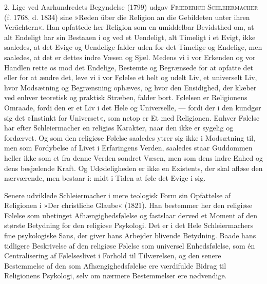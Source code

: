 \documentclass[12pt,a4paper,openany]{book}
\newcommand{\opage}[1]{\marginnote{\footnotesize\textit{[#1]}}}
\begin{document}
2. Lige ved Aarhundredets Begyndelse (1799) udgav
\textsc{Friederich Schleiermacher} (f. 1768, d. 1834) sine »Reden
über die Religion an die Gebildeten unter ihren Verächtern«.
Han opfattede her Religion som en umiddelbar
Bevidsthed om, at alt Endeligt har sin Bestaaen i og
ved et Uendeligt, alt Timeligt i et Evigt, ikke saaledes,
at det Evige og Uendelige falder uden for det Timelige
og Endelige, men saaledes, at det er dettes indre Væsen
og Sjæl. Medens vi i vor Erkenden og vor Handlen
rette os mod det Endelige, Bestemte og Begrænsede for
at opfatte det eller for at ændre det, leve vi i vor Følelse
et helt og udelt Liv, et universelt Liv, hvor Modsætning
og Begrænsning ophæves, og hvor den Ensidighed,
der klæber ved enhver teoretisk og praktisk Stræben,
falder bort. Følelsen er Religionens Omraade, fordi den
er et Liv i det Hele og Universelle, --- fordi der i den
kundgør sig det »Instinkt for Universet«, som netop er
Et med Religionen. Enhver Følelse har efter Schleiermacher
en religiøs Karakter, naar den ikke er sygelig
og fordærvet. Og som den religiøse Følelse saaledes
ytrer sig ikke i Modsætning til, men som Fordybelse af
Livet i Erfaringens Verden, saaledes staar Guddommen
heller ikke som et fra denne Verden sondret Væsen, men
som dens indre Enhed og dens besjælende Kraft. Og
Udødeligheden er ikke en Existents, der skal afløse den
nærværende, men bestaar i: midt i Tiden at føle det Evige
i sig.

\opage{7}Senere udviklede Schleiermacher i mere teologisk
Form sin Opfattelse af Religionen i »Der christliche
Glaube« (1821). Han bestemmer her den religiøse Følelse
som ubetinget Afhængighedsfølelse og fastslaar derved et
Moment af den største Betydning for den religiøse Psykologi.
Det er i det Hele Schleiermachers fine psykologiske
Sans, der giver hans Arbejder blivende Betydning.
Baade hans tidligere Beskrivelse af den religiøse Følelse
som universel Enhedsfølelse, som én Centralisering af
Følelseslivet i Forhold til Tilværelsen, og den senere Bestemmelse
af den som Afhængighedsfølelse ere værdifulde
Bidrag til Religionens Psykologi, selv om nærmere Bestemmelser
ere nødvendige.
\end{document}
